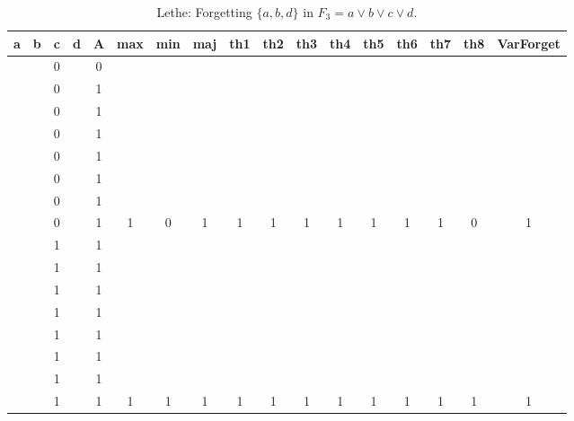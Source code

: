 \begin{table}[!tb]
    \centering
    \begin{tabular}{|c|c|c|c|c|c|c|c|c|c|c|c|c|c|c|c|c|}
        \hline
        \textbf{a} & \textbf{b} & \textbf{c} & \textbf{d} & \textbf{A} & \textbf{max} & \textbf{min} & \textbf{maj} & \textbf{th1} & \textbf{th2} & \textbf{th3} & \textbf{th4} & \textbf{th5} & \textbf{th6} & \textbf{th7} & \textbf{th8} & \textbf{VarForget} \\ \hline
        \rowcolor{gray!40}  &  & 0 &  & 0 &  &  &  &  &  &  &  &  &  &  &  &  \\ \hline
        \rowcolor{gray!40}  &  & 0 &  & 1 &  &  &  &  &  &  &  &  &  &  &  &  \\ \hline
        \rowcolor{gray!40}  &  & 0 &  & 1 &  &  &  &  &  &  &  &  &  &  &  &  \\ \hline
        \rowcolor{gray!40}  &  & 0 &  & 1 &  &  &  &  &  &  &  &  &  &  &  &  \\ \hline
        \rowcolor{gray!40}  &  & 0 &  & 1 &  &  &  &  &  &  &  &  &  &  &  &  \\ \hline
        \rowcolor{gray!40}  &  & 0 &  & 1 &  &  &  &  &  &  &  &  &  &  &  &  \\ \hline
        \rowcolor{gray!40}  &  & 0 &  & 1 &  &  &  &  &  &  &  &  &  &  &  &  \\ \hline
        \rowcolor{gray!40}  &  & 0 &  & 1 & 1 & 0 & 1 & 1 & 1 & 1 & 1 & 1 & 1 & 1 & 0 & 1 \\ \hline
        \rowcolor{blue!40}  &  & 1 &  & 1 &  &  &  &  &  &  &  &  &  &  &  &  \\ \hline
        \rowcolor{blue!40}  &  & 1 &  & 1 &  &  &  &  &  &  &  &  &  &  &  &  \\ \hline
        \rowcolor{blue!40}  &  & 1 &  & 1 &  &  &  &  &  &  &  &  &  &  &  &  \\ \hline
        \rowcolor{blue!40}  &  & 1 &  & 1 &  &  &  &  &  &  &  &  &  &  &  &  \\ \hline
        \rowcolor{blue!40}  &  & 1 &  & 1 &  &  &  &  &  &  &  &  &  &  &  &  \\ \hline
        \rowcolor{blue!40}  &  & 1 &  & 1 &  &  &  &  &  &  &  &  &  &  &  &  \\ \hline
        \rowcolor{blue!40}  &  & 1 &  & 1 &  &  &  &  &  &  &  &  &  &  &  &  \\ \hline
        \rowcolor{blue!40}  &  & 1 &  & 1 & 1 & 1 & 1 & 1 & 1 & 1 & 1 & 1 & 1 & 1 & 1 & 1 \\ \hline
    \end{tabular}
    \caption{Lethe: Forgetting $\{a, b, d\}$ in $F_{3} = a \lor b \lor c \lor d$.}
    \label{tab:lethe-F3-abd}
\end{table}
